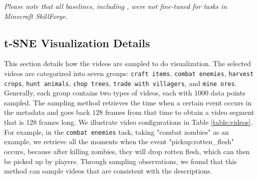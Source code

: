 \documentclass[11pt, a4paper, logo, one column]{craftjarvis}
\begin{document}
\emph{Please note that all baselines, including \agent, were not fine-tuned for tasks in Minecraft SkillForge. }


\subsection{t-SNE Visualization Details} \label{appendix:tsne}
\fancyfoot[L]{}
This section details how the videos are sampled to do visualization. 
The selected videos are categorized into seven groups: \texttt{craft items}, \texttt{combat enemies}, \texttt{harvest crops}, \texttt{hunt animals}, \texttt{chop trees}, \texttt{trade with villagers}, and \texttt{mine ores}. Generally, each group contains two types of videos, each with $1000$ data points sampled. The sampling method retrieves the time when a certain event occurs in the metadata and goes back $128$ frames from that time to obtain a video segment that is $128$ frames long. We illustrate video configurations in Table \ref{table:videos}. For example, in the \texttt{combat enemies} task, taking "combat zombies" as an example, we retrieve all the moments when the event "pickup:rotten\_flesh" occurs, because after killing zombies, they will drop rotten flesh, which can then be picked up by players. Through sampling observations, we found that this method can sample videos that are consistent with the descriptions. 
\end{document}
